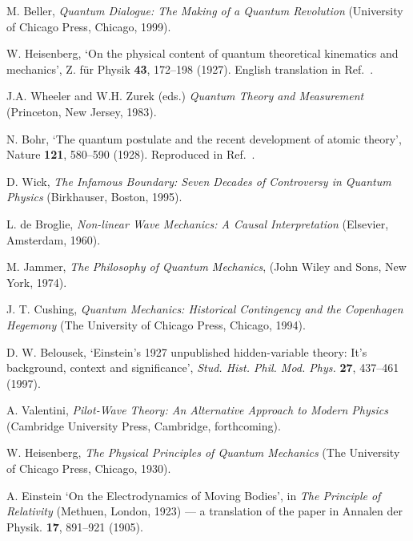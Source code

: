 \documentclass[12pt]{iopart}
\begin{document}
\begin{thebibliography}{10}
M. Beller, {\em Quantum Dialogue: The Making of a Quantum
Revolution} (University of Chicago Press, Chicago, 1999).

W. Heisenberg, `On the physical content of quantum theoretical kinematics and mechanics',
Z. f\"ur
Physik {\bf 43}, 172--198 (1927). English translation in
Ref.~\cite{WheZur83}.

J.A. Wheeler and W.H. Zurek (eds.)
{\em Quantum Theory and Measurement}
(Princeton, New Jersey, 1983).

N. Bohr, `The quantum postulate and the recent development of
atomic theory', Nature {\bf 121}, 580--590 (1928). Reproduced in
Ref.~\cite{WheZur83}.

D. Wick, {\em The Infamous Boundary: Seven Decades of Controversy in
Quantum Physics} (Birkhauser, Boston, 1995).


L. de Broglie, 
{\em Non-linear Wave Mechanics: A Causal Interpretation}  (Elsevier,
Amsterdam, 1960).

M. Jammer, {\em The Philosophy of Quantum Mechanics}, 
(John Wiley and Sons, New York, 1974).

J. T. Cushing, {\em Quantum Mechanics: Historical Contingency and
the Copenhagen Hegemony} (The University of Chicago Press, Chicago,
1994).

D. W. Belousek, `Einstein's 1927 unpublished hidden-variable theory:
It's background, context and significance', \emph{Stud. Hist. Phil.
Mod. Phys.} {\bf 27}, 437--461 (1997).

A. Valentini,
{\em Pilot-Wave Theory: An Alternative Approach to Modern Physics}
(Cambridge University Press, Cambridge, forthcoming).

W. Heisenberg,
{\em The Physical Principles of Quantum Mechanics}
(The University of Chicago Press, Chicago, 1930).

A. Einstein 
`On the Electrodynamics of Moving Bodies', 
in  {\em The Principle of Relativity} (Methuen, London, 1923) --- 
a translation of the paper in Annalen der Physik. {\bf 17}, 891--921 (1905).


\end{thebibliography}
\end{document}
